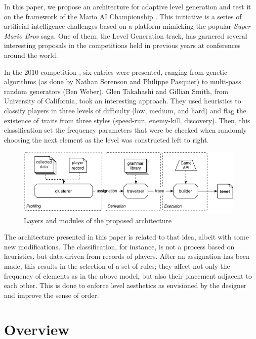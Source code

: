 \documentclass[conference]{IEEEtran}
\begin{document}
In this paper, we propose an architecture for adaptive level generation and test it on the framework of the Mario AI Championship \cite{marioai}. This initiative is a series of artificial intelligence challenges based on a platform mimicking the popular \textit{Super Mario Bros} saga. One of them, the Level Generation track, has garnered several interesting proposals in the competitions held in previous years at conferences around the world.

In the 2010 competition \cite{mario2010}, six entries were presented, ranging from genetic algorithms (as done by Nathan Sorenson and Philippe Pasquier) to multi-pass random generators (Ben Weber). Glen Takahashi and Gillian Smith, from University of California, took an interesting approach. They used heuristics to classify players in three levels of difficulty (low, medium, and hard) and flag the existence of traits from three styles (speed-run, enemy-kill, discovery). Then, this classification set the frequency parameters that were be checked when randomly choosing the next element as the level was constructed left to right.

\begin{figure}[htp]
\centerline{\includegraphics[width=1.5\columnwidth]{layers.png}}
\caption{Layers and modules of the proposed architecture}
\label{layers}
\end{figure}

The architecture presented in this paper is related to that idea, albeit with some new modifications. The classification, for instance, is not a process based on heuristics, but data-driven from records of players. After an assignation has been made, this results in the selection of a set of rules; they affect not only the frequency of elements as in the above model, but also their placement adjacent to each other. This is done to enforce level aesthetics as envisioned by the designer and improve the sense of order.



\section{Overview}
\end{document}
